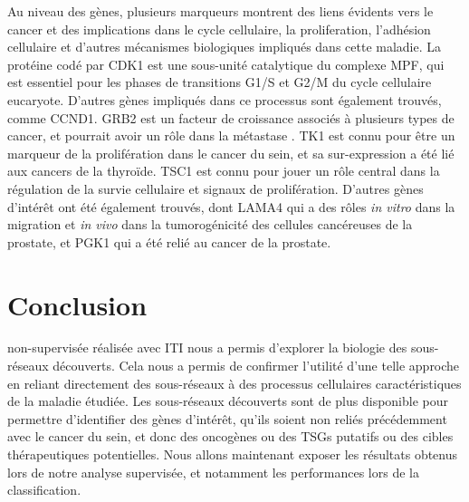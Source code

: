 		Au niveau des gènes, plusieurs marqueurs montrent des liens évidents vers le cancer et des implications dans le cycle cellulaire, la proliferation, l'adhésion cellulaire et d'autres mécanismes biologiques impliqués dans cette maladie.
		La protéine codé par \acs{CDK1} est une sous-unité catalytique du complexe \acs{MPF}, qui est essentiel pour les phases de transitions G1/S et G2/M du cycle cellulaire eucaryote.
		D'autres gènes impliqués dans ce processus sont également trouvés, comme \acs{CCND1}.
		\acs{GRB2} est un facteur de croissance associés à plusieurs types de cancer, et pourrait avoir un rôle dans la métastase \citet{Yu2008}.
		\acs{TK1} est connu pour être un marqueur de la prolifération dans le cancer du sein, et sa sur-expression a été lié aux cancers de la thyroïde.
		\acs{TSC1} est connu pour jouer un rôle central dans la régulation de la survie cellulaire et signaux de prolifération.
		D'autres gènes d'intérêt ont été également trouvés, dont \acs{LAMA4} qui a des rôles \emph{in vitro} dans la migration et \emph{in vivo} dans la tumorogénicité des cellules cancéreuses de la prostate, et \acs{PGK1} qui a été relié au cancer de la prostate.

\pagebreak

	\section{\textcolor{green!45!black}{{Conclusion}}}
		 non-supervisée réalisée avec ITI nous a permis d'explorer la biologie des sous-réseaux découverts.
		Cela nous a permis de confirmer l'utilité d'une telle approche en reliant directement des sous-réseaux à des processus cellulaires caractéristiques de la maladie étudiée.
		Les sous-réseaux découverts sont de plus disponible pour permettre d'identifier des gènes d'intérêt, qu'ils soient non reliés précédemment avec le cancer du sein, et donc des oncogènes ou des \acsp{TSG} putatifs ou des cibles thérapeutiques potentielles.
		Nous allons maintenant exposer les résultats obtenus lors de notre analyse supervisée, et notamment les performances lors de la classification.
		
